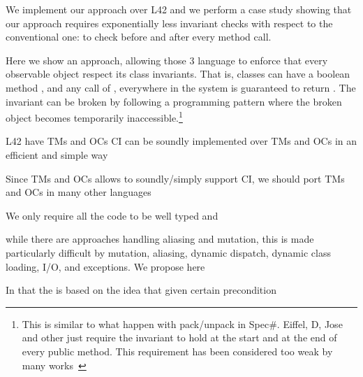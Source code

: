 We implement our approach over L42 and we perform a
case study showing that our approach requires 
exponentially less invariant checks with respect to the conventional one: to check before and after every method call.


Here we show an approach, allowing those 3 language 
to  enforce that every observable object respect its class invariants.
That is, classes can have a boolean method \Q@invariant@,
and any call of \Q@invariant@, everywhere in the system is guaranteed to return \Q@true@.
The invariant can be broken by following a programming pattern where the broken object becomes temporarily inaccessible.\footnote{
	This is similar to what happen with pack/unpack in Spec\#.
	Eiffel, D, Jose and other just require the invariant to hold at the start and at the end of every public method. This requirement has been considered too weak by many works~\cite{??}
}





L42 have TMs and OCs
CI can be soundly implemented over TMs and OCs
in an efficient and simple way

Since TMs and OCs allows to soundly/simply support CI,
we should port TMs and OCs in many other languages


\LINE


We only require all the code to be well typed and 


while 
there are approaches handling aliasing and mutation,
this is made particularly difficult by mutation, aliasing, dynamic dispatch, dynamic class loading,
I/O, and exceptions.
We propose here 

In
that the 
is based on the idea that 
given certain precondition










